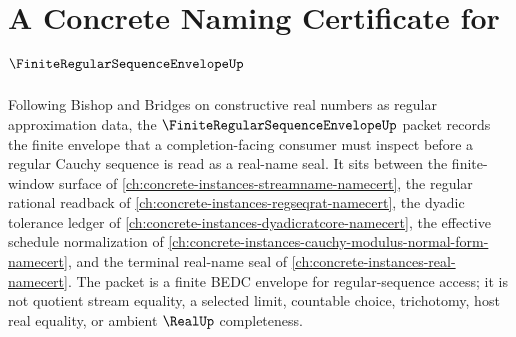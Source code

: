 \chapter{A Concrete Naming Certificate for $\FiniteRegularSequenceEnvelopeUp$}
\label{ch:concrete-instances-finite-regular-sequence-envelope-namecert}

Following Bishop and Bridges on constructive real numbers as regular approximation data, the $\FiniteRegularSequenceEnvelopeUp$ packet records the finite envelope that a completion-facing consumer must inspect before a regular Cauchy sequence is read as a real-name seal. It sits between the finite-window surface of \autoref{ch:concrete-instances-streamname-namecert}, the regular rational readback of \autoref{ch:concrete-instances-regseqrat-namecert}, the dyadic tolerance ledger of \autoref{ch:concrete-instances-dyadicratcore-namecert}, the effective schedule normalization of \autoref{ch:concrete-instances-cauchy-modulus-normal-form-namecert}, and the terminal real-name seal of \autoref{ch:concrete-instances-real-namecert}. The packet is a finite BEDC envelope for regular-sequence access; it is not quotient stream equality, a selected limit, countable choice, trichotomy, host real equality, or ambient $\RealUp$ completeness.

